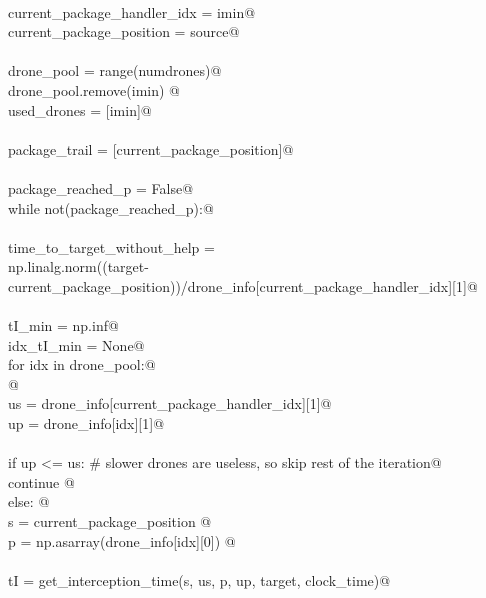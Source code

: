 \documentclass[10.0pt]{report}
\begin{document}
\begin{flushleft}
\begin{list}{}{}
\mbox{}\verb@@\\
\mbox{}\verb@    current_package_handler_idx = imin@\\
\mbox{}\verb@    current_package_position    = source@\\
\mbox{}\verb@@\\
\mbox{}\verb@    drone_pool = range(numdrones)@\\
\mbox{}\verb@    drone_pool.remove(imin) @\\
\mbox{}\verb@    used_drones = [imin]@\\
\mbox{}\verb@@\\
\mbox{}\verb@    package_trail = [current_package_position]@\\
\mbox{}\verb@@\\
\mbox{}\verb@    package_reached_p   = False@\\
\mbox{}\verb@    while not(package_reached_p):@\\
\mbox{}\verb@@\\
\mbox{}\verb@          time_to_target_without_help =\@\\
\mbox{}\verb@              np.linalg.norm((target-current_package_position))/drone_info[current_package_handler_idx][1]@\\
\mbox{}\verb@@\\
\mbox{}\verb@          tI_min     = np.inf@\\
\mbox{}\verb@          idx_tI_min = None@\\
\mbox{}\verb@          for idx in drone_pool:@\\
\mbox{}\verb@              @\\
\mbox{}\verb@              us = drone_info[current_package_handler_idx][1]@\\
\mbox{}\verb@              up = drone_info[idx][1]@\\
\mbox{}\verb@@\\
\mbox{}\verb@              if up <= us: # slower drones are useless, so skip rest of the iteration@\\
\mbox{}\verb@                  continue @\\
\mbox{}\verb@              else: @\\
\mbox{}\verb@                s = current_package_position @\\
\mbox{}\verb@                p = np.asarray(drone_info[idx][0]) @\\
\mbox{}\verb@@\\
\mbox{}\verb@                tI = get_interception_time(s, us, p, up, target, clock_time)@\\

\end{list}
\end{flushleft}
\end{document}
